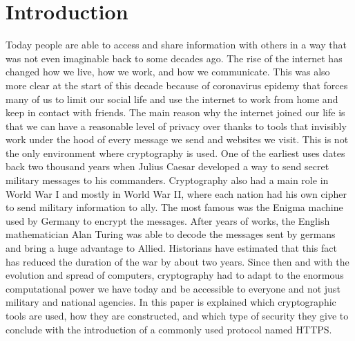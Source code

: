\chapter{Introduction}
Today people are able to access and share information with others in a way that was not even imaginable back to some decades ago. The rise of the internet has changed how we live, how we work, and how we communicate. This was also more clear at the start of this decade because of coronavirus epidemy that forces many of us to limit our social life and use the internet to work from home and keep in contact with friends. The main reason why the internet joined our life is that we can have a reasonable level of privacy over thanks to tools that invisibly work under the hood of every message we send and websites we visit. This is not the only environment where cryptography is used. One of the earliest uses dates back two thousand years when Julius Caesar developed a way to send secret military messages to his commanders. Cryptography also had a main role in World War I and mostly in World War II, where each nation had his own cipher to send military information to ally. The most famous was the Enigma machine used by Germany to encrypt the messages. After years of works, the English mathematician Alan Turing was able to decode the messages sent by germans and bring a huge advantage to Allied. Historians have estimated that this fact has reduced the duration of the war by about two years. Since then and with the evolution and spread of computers, cryptography had to adapt to the enormous computational power we have today and be accessible to everyone and not just military and national agencies. In this paper is explained which cryptographic tools are used, how they are constructed, and which type of security they give to conclude with the introduction of a commonly used protocol named HTTPS.

